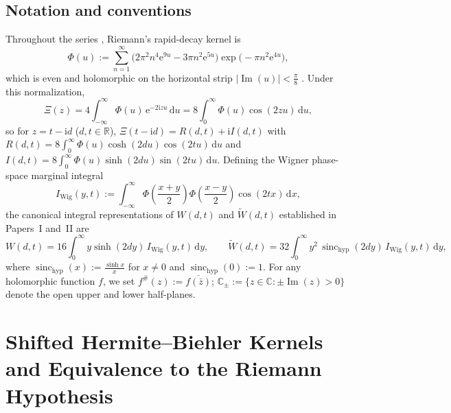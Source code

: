 \documentclass[11pt,reqno]{amsart}
\theoremstyle{definition}
\theoremstyle{remark}
\numberwithin{equation}{section}
\newcommand{\ii}{\mathrm{i}}
\newcommand{\ee}{\mathrm{e}}
\newcommand{\dd}{\mathrm{d}}
\newcommand{\Ima}{\operatorname{Im}}
\newcommand{\sinch}{\operatorname{sinc}_{\mathrm{hyp}}}
\begin{document}
\subsection{Notation and conventions}\label{subsec:notation}

Throughout the series \cite{Missiaen2026Paper1,Missiaen2026Paper2,Missiaen2026Paper3}, Riemann's rapid-decay kernel is
\begin{equation}\label{eq:Phi_def}
  \Phi(u) := \sum_{n=1}^{\infty}\bigl(2\pi^2 n^4 \ee^{9u} - 3\pi n^2 \ee^{5u}\bigr)\exp\bigl(-\pi n^2 \ee^{4u}\bigr),
\end{equation}
which is even and holomorphic on the horizontal strip $\lvert\Ima(u)\rvert < \frac{\pi}{8}$ \cite{Polya1926,Titchmarsh1986}. Under this normalization,
\begin{equation}\label{eq:Xi_canonical}
  \Xi(z) = 4\int_{-\infty}^{\infty}\Phi(u)\,\ee^{-2\ii zu}\,\dd u = 8\int_0^{\infty}\Phi(u)\cos(2zu)\,\dd u,
\end{equation}
so for $z = t - \ii d$ ($d, t \in \mathbb{R}$), $\Xi(t-\ii d) = R(d,t) + \ii I(d,t)$ with $R(d,t) = 8\int_0^\infty \Phi(u)\cosh(2du)\cos(2tu)\,\dd u$ and $I(d,t) = 8\int_0^\infty \Phi(u)\sinh(2du)\sin(2tu)\,\dd u$. Defining the Wigner phase-space marginal integral \cite{Wigner1932,Missiaen2026Paper1}
\begin{equation}\label{eq:I_Wig_def}
  I_{\mathrm{Wig}}(y,t) := \int_{-\infty}^{\infty}\Phi\!\left(\frac{x+y}{2}\right)\Phi\!\left(\frac{x-y}{2}\right)\cos(2tx)\,\dd x,
\end{equation}
the canonical integral representations of $W(d,t)$ and $\widetilde{W}(d,t)$ established in Papers~I and~II are
\begin{equation}\label{eq:W_Wigner_canonical}
  W(d,t) = 16\int_0^{\infty} y\sinh(2dy)\,I_{\mathrm{Wig}}(y,t)\,\dd y,
  \qquad
  \widetilde{W}(d,t) = 32\int_0^{\infty} y^2\,\sinch(2dy)\,I_{\mathrm{Wig}}(y,t)\,\dd y,
\end{equation}
where $\sinch(x) := \frac{\sinh x}{x}$ for $x \neq 0$ and $\sinch(0) := 1$. For any holomorphic function $f$, we set $f^\#(z) := \overline{f(\bar{z})}$; $\mathbb{C}_\pm := \{z \in \mathbb{C} : \pm\Ima(z) > 0\}$ denote the open upper and lower half-planes.

\section{Shifted Hermite--Biehler Kernels and Equivalence to the Riemann Hypothesis}\label{sec:debranges}
\end{document}
